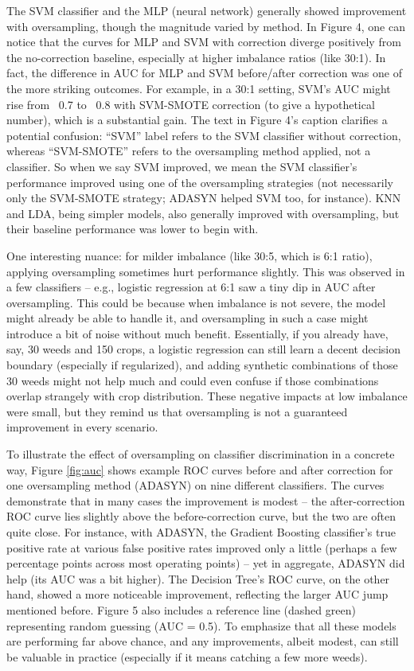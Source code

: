 \documentclass[agriengineering,article,submit,pdftex,moreauthors]{Definitions/mdpi}
\begin{document}
 The SVM classifier and the MLP (neural network) generally showed improvement with oversampling, though the magnitude varied by method. In Figure 4, one can notice that the curves for MLP and SVM with correction diverge positively from the no-correction baseline, especially at higher imbalance ratios (like 30:1). In fact, the difference in AUC for MLP and SVM before/after correction was one of the more striking outcomes. For example, in a 30:1 setting, SVM’s AUC might rise from ~0.7 to ~0.8 with SVM-SMOTE correction (to give a hypothetical number), which is a substantial gain. The text in Figure 4’s caption clarifies a potential confusion: “SVM” label refers to the SVM classifier without correction, whereas “SVM-SMOTE” refers to the oversampling method applied, not a classifier.  So when we say SVM improved, we mean the SVM classifier’s performance improved using one of the oversampling strategies (not necessarily only the SVM-SMOTE strategy; ADASYN helped SVM too, for instance). KNN and LDA, being simpler models, also generally improved with oversampling, but their baseline performance was lower to begin with.

One interesting nuance: for milder imbalance (like 30:5, which is 6:1 ratio), applying oversampling sometimes hurt performance slightly. This was observed in a few classifiers – e.g., logistic regression at 6:1 saw a tiny dip in AUC after oversampling. This could be because when imbalance is not severe, the model might already be able to handle it, and oversampling in such a case might introduce a bit of noise without much benefit. Essentially, if you already have, say, 30 weeds and 150 crops, a logistic regression can still learn a decent decision boundary (especially if regularized), and adding synthetic combinations of those 30 weeds might not help much and could even confuse if those combinations overlap strangely with crop distribution. These negative impacts at low imbalance were small, but they remind us that oversampling is not a guaranteed improvement in every scenario.

To illustrate the effect of oversampling on classifier discrimination in a concrete way, Figure \ref{fig:auc} shows example ROC curves before and after correction for one oversampling method (ADASYN) on nine different classifiers.  The curves demonstrate that in many cases the improvement is modest – the after-correction ROC curve lies slightly above the before-correction curve, but the two are often quite close. For instance, with ADASYN, the Gradient Boosting classifier’s true positive rate at various false positive rates improved only a little (perhaps a few percentage points across most operating points) – yet in aggregate, ADASYN did help (its AUC was a bit higher). The Decision Tree’s ROC curve, on the other hand, showed a more noticeable improvement, reflecting the larger AUC jump mentioned before. Figure 5 also includes a reference line (dashed green) representing random guessing (AUC = 0.5). To emphasize that all these models are performing far above chance, and any improvements, albeit modest, can still be valuable in practice (especially if it means catching a few more weeds).
\end{document}
